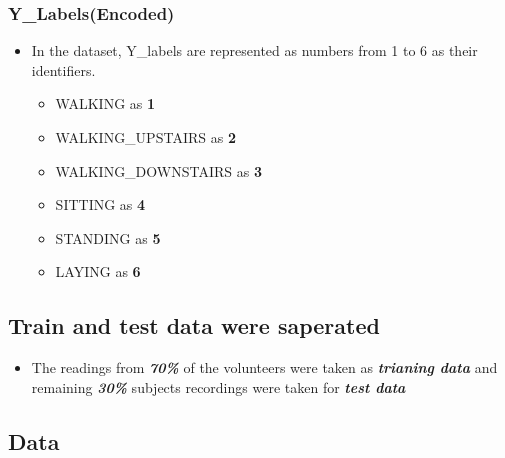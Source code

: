 \documentclass[11pt]{article}
\providecommand{\tightlist}{%
      \setlength{\itemsep}{0pt}\setlength{\parskip}{0pt}}
\begin{document}
\hypertarget{y_labelsencoded}{%
\subsubsection{Y\_Labels(Encoded)}\label{y_labelsencoded}}

\begin{itemize}
\item
  In the dataset, Y\_labels are represented as numbers from 1 to 6 as
  their identifiers.

  \begin{itemize}
  \tightlist
  \item
    WALKING as \textbf{1}
  \item
    WALKING\_UPSTAIRS as \textbf{2}
  \item
    WALKING\_DOWNSTAIRS as \textbf{3}
  \item
    SITTING as \textbf{4}
  \item
    STANDING as \textbf{5}
  \item
    LAYING as \textbf{6}
  \end{itemize}
\end{itemize}

\hypertarget{train-and-test-data-were-saperated}{%
\subsection{Train and test data were
saperated}\label{train-and-test-data-were-saperated}}

\begin{itemize}
\tightlist
\item
  The readings from \textbf{\emph{70\%}} of the volunteers were taken as
  \textbf{\emph{trianing data}} and remaining \textbf{\emph{30\%}}
  subjects recordings were taken for \textbf{\emph{test data}}
\end{itemize}

\hypertarget{data}{%
\subsection{Data}\label{data}}
\end{document}
